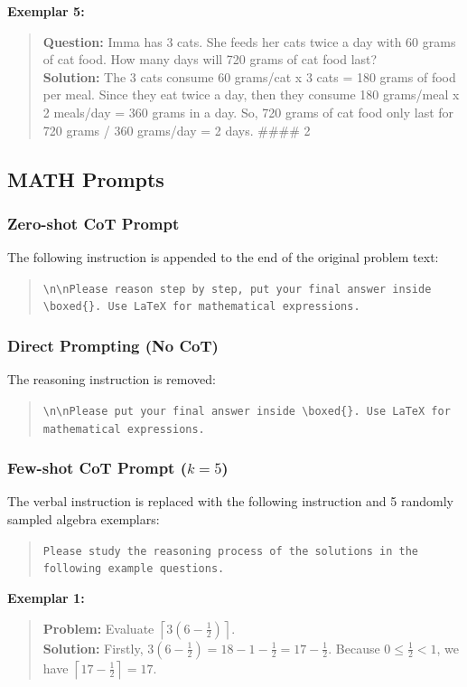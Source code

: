 \documentclass{article}
\begin{document}
\noindent\textbf{Exemplar 5:}
\begin{quote}
\small
\textbf{Question:} Imma has 3 cats. She feeds her cats twice a day with 60 grams of cat food. How many days will 720 grams of cat food last? \\
\textbf{Solution:} The 3 cats consume 60 grams/cat x 3 cats = 180 grams of food per meal. Since they eat twice a day, then they consume 180 grams/meal x 2 meals/day = 360 grams in a day. So, 720 grams of cat food only last for 720 grams / 360 grams/day = 2 days. \#\#\#\# 2
\end{quote}


\subsection{MATH Prompts}

\subsubsection{Zero-shot CoT Prompt}
The following instruction is appended to the end of the original problem text:
\begin{quote}
\small
\texttt{\textbackslash n\textbackslash nPlease reason step by step, put your final answer inside \textbackslash boxed\{\}. Use LaTeX for mathematical expressions.}
\end{quote}

\subsubsection{Direct Prompting (No CoT)}
The reasoning instruction is removed:
\begin{quote}
\small
\texttt{\textbackslash n\textbackslash nPlease put your final answer inside \textbackslash boxed\{\}. Use LaTeX for mathematical expressions.}
\end{quote}

\subsubsection{Few-shot CoT Prompt ($k=5$)}
The verbal instruction is replaced with the following instruction and 5 randomly sampled algebra exemplars:
\begin{quote}
\small
\texttt{Please study the reasoning process of the solutions in the following example questions.}
\end{quote}

\noindent\textbf{Exemplar 1:}
\begin{quote}
\small
\textbf{Problem:} Evaluate $\left\lceil3\left(6-\frac12\right)\right\rceil$. \\
\textbf{Solution:} Firstly, $3\left(6-\frac12\right)=18-1-\frac12=17-\frac12$. Because $0\le\frac12<1$, we have $\left\lceil17-\frac12\right\rceil=\boxed{17}$.
\end{quote}
\end{document}
